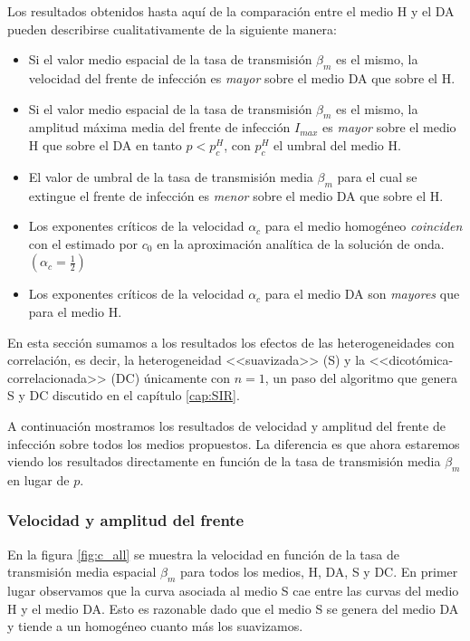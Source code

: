 Los resultados obtenidos hasta aquí de la comparación entre el medio H y el DA pueden describirse cualitativamente de la siguiente manera: 
 \begin{itemize}
     \item Si el valor medio espacial de la tasa de transmisión $\beta_m$ es el mismo, la velocidad del frente de infección es \textit{mayor} sobre el medio 
     DA que sobre el H.
     \item Si el valor medio espacial de la tasa de transmisión $\beta_m$ es el mismo, la amplitud máxima media del frente de infección $I_{max}$ es 
     \textit{mayor} sobre el medio H que sobre el DA en tanto $p<p_c^H$, con $p_c^{H}$ el umbral del medio H.
     \item El valor de umbral de la tasa de transmisión media $\beta_m$ para el cual se extingue el frente de infección es \textit{menor} sobre el medio DA que sobre el H.
     \item Los exponentes críticos de la velocidad $\alpha_c$ para el medio homogéneo \textit{coinciden} con el estimado por $c_0$ en la aproximación analítica de la solución de onda. $(\alpha_c = \frac{1}{2})$
     \item Los exponentes críticos de la velocidad $\alpha_c$ para el medio DA son \textit{mayores} que para el medio H.
 \end{itemize}

 

En esta sección sumamos a los resultados los efectos de las heterogeneidades con correlación, es decir, la heterogeneidad <<suavizada>> (S) y la <<dicotómica-correlacionada>> (DC) únicamente con $n = 1$, un paso del algoritmo que genera S y DC discutido en el capítulo \ref{cap:SIR}.


A continuación mostramos los resultados de velocidad y amplitud del frente de infección sobre todos los medios propuestos. La diferencia es que ahora estaremos viendo los resultados directamente en función de la tasa de transmisión media $\beta_m$ en lugar de $p$.


\subsubsection*{Velocidad y amplitud del frente}

En la figura \ref{fig:c_all} se muestra la velocidad en función de la tasa de transmisión media espacial $\beta_m$ para todos los medios, H, DA, S y DC. En primer lugar observamos que la curva asociada al medio S cae entre las curvas del medio H y el medio DA. Esto es razonable dado que el medio S se genera del medio DA y tiende a un homogéneo cuanto más los suavizamos.

